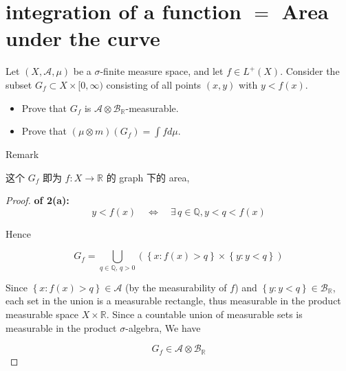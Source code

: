 \documentclass{qlnotes-export}
\begin{document}
\section{\texorpdfstring{integration of a function \(=\) Area under the curve}{integration of a function = Area under the curve}}\label{integration-of-a-function-area-under-the-curve}

Let \((X,\mathcal{A},\mu)\) be a \(\sigma\)-finite measure space, and let \(f \in L^{+}(X)\). Consider the subset \(G_{f} \subset X \times \lbrack 0,\infty)\) consisting of all points \((x,y)\) with \(y < f(x)\).

\begin{itemize}
\item
  Prove that \(G_{f}\) is \(\mathcal{A} \otimes \mathcal{B}_{\mathbb{R}}\)-measurable.
\item
  Prove that \((\mu \otimes m)(G_{f}) = \int f d\mu\).
\end{itemize}

\begin{qlremark}{Remark}

这个 \(G_{f}\) 即为 \(f:X\rightarrow{\mathbb{R}}\) 的 graph 下的 area,

\end{qlremark}

\begin{proof}

\textbf{of 2(a):}\\

\[y < f(x)\quad\Leftrightarrow\quad\exists\, q \in {\mathbb{Q}}, y < q < f(x)\]

Hence

\[G_{f} = \bigcup\limits_{q \in {\mathbb{Q}},\, q > 0}(\left\{ {x:f(x) > q} \right\} \times \left\{ {y:y < q} \right\})\]

Since \(\left\{ {x:f(x) > q} \right\} \in \mathcal{A}\) (by the measurability of \(f\)) and \(\left\{ {y:y < q} \right\} \in \mathcal{B}_{\mathbb{R}}\), each set in the union is a measurable rectangle, thus measurable in the product measurable space \(X \times {\mathbb{R}}\). Since a countable union of measurable sets is measurable in the product \(\sigma\)-algebra, We have

\[G_{f} \in \mathcal{A} \otimes \mathcal{B}_{\mathbb{R}}\]

\end{proof}
\end{document}
